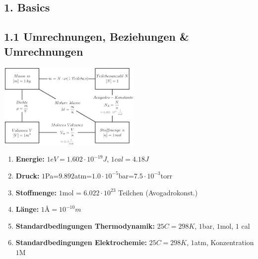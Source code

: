 




\begin{multicols*}{4}



\section{1. Basics}
\subsection{1.1 Umrechnungen, Beziehungen \& Umrechnungen}{
    \centering
\includegraphics[width = 69mm]{Bilder/Zusammenhang.png}\\
\begin{enumerate}[noitemsep]
    \item \textbf{Energie:} $1eV=1.602\cdot 10^{-19}J$,    $1cal=4.18J$
    \item \textbf{Druck:} $1$Pa=$9.892$atm=$1.0\cdot 10^{-5}$bar=$7.5\cdot 10^{-3}$torr
    \item \textbf{Stoffmenge: } $1$mol = $6.022\cdot 10^{23}$ Teilchen (Avogadrokonst.)
    \item \textbf{Länge:} $1\text{Å}=10^{-10}m$
    \item \textbf{Standardbedingungen Thermodynamik: } $25C=298K$,  $1$bar,  $1$mol, $1$ cal
    \item \textbf{Standardbedingungen Elektrochemie: } $25C=298K$,  $1$atm, Konzentration $1$M
\end{enumerate}
}



\end{multicols*}

